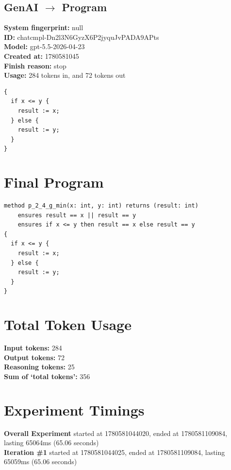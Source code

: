 \documentclass{article}
\begin{document}
\subsection*{GenAI $\rightarrow$ Program}
\textbf{System fingerprint: }null
\\\textbf{ID: }chatcmpl-Dn2l3N6GyzX6P2jyquJvPADA9APts
\\\textbf{Model: }gpt-5.5-2026-04-23
\\\textbf{Created at: }1780581045
\\\textbf{Finish reason: }stop
\\\textbf{Usage: }284 tokens in, and 72 tokens out
\begin{lstlisting}
{
  if x <= y {
    result := x;
  } else {
    result := y;
  }
}
\end{lstlisting}
\section*{Final Program}
\begin{lstlisting}
method p_2_4_g_min(x: int, y: int) returns (result: int)
	ensures result == x || result == y
	ensures if x <= y then result == x else result == y
{
  if x <= y {
    result := x;
  } else {
    result := y;
  }
}
\end{lstlisting}
\section*{Total Token Usage}
\textbf{Input tokens: }284
\\\textbf{Output tokens: }72
\\\textbf{Reasoning tokens: }25
\\\textbf{Sum of `total tokens': }356
\section*{Experiment Timings}
\textbf{Overall Experiment} started at 1780581044020, ended at 1780581109084, lasting 65064ms (65.06 seconds)
\\\textbf{Iteration \#1} started at 1780581044025, ended at 1780581109084, lasting 65059ms (65.06 seconds)
\end{document}
